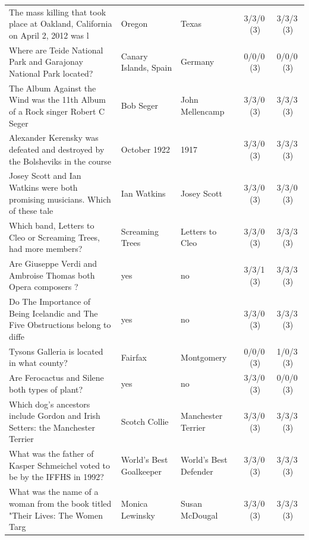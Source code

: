 \begin{longtable}{@{}p{6.6cm}p{2.9cm}p{2.9cm}cc@{}}
The mass killing that took place at Oakland, California on April 2, 2012 was l & Oregon & Texas & 3/3/0\,\footnotesize(3) & 3/3/3\,\footnotesize(3) \\
\rowcolor{neutralgray}
Where are Teide National Park and Garajonay National Park located? & Canary Islands, Spain & Germany & 0/0/0\,\footnotesize(3) & 0/0/0\,\footnotesize(3) \\
The Album Against the Wind was the 11th Album of a Rock singer Robert C Seger  & Bob Seger & John Mellencamp & 3/3/0\,\footnotesize(3) & 3/3/3\,\footnotesize(3) \\
\rowcolor{neutralgray}
Alexander Kerensky was defeated and destroyed by the Bolsheviks in the course  & October 1922 & 1917 & 3/3/0\,\footnotesize(3) & 3/3/3\,\footnotesize(3) \\
Josey Scott and Ian Watkins were both promising musicians. Which of these tale & Ian Watkins & Josey Scott & 3/3/0\,\footnotesize(3) & 3/3/0\,\footnotesize(3) \\
\rowcolor{neutralgray}
Which band, Letters to Cleo or Screaming Trees, had more members? & Screaming Trees & Letters to Cleo & 3/3/0\,\footnotesize(3) & 3/3/3\,\footnotesize(3) \\
Are Giuseppe Verdi and Ambroise Thomas both Opera composers ? & yes & no & 3/3/1\,\footnotesize(3) & 3/3/3\,\footnotesize(3) \\
\rowcolor{neutralgray}
Do The Importance of Being Icelandic and The Five Obstructions belong to diffe & yes & no & 3/3/0\,\footnotesize(3) & 3/3/3\,\footnotesize(3) \\
Tysons Galleria is located in what county? & Fairfax & Montgomery & 0/0/0\,\footnotesize(3) & 1/0/3\,\footnotesize(3) \\
\rowcolor{neutralgray}
Are Ferocactus and Silene both types of plant? & yes & no & 3/3/0\,\footnotesize(3) & 0/0/0\,\footnotesize(3) \\
Which dog's ancestors include Gordon and Irish Setters: the Manchester Terrier & Scotch Collie & Manchester Terrier & 3/3/0\,\footnotesize(3) & 3/3/3\,\footnotesize(3) \\
\rowcolor{neutralgray}
What was the father of Kasper Schmeichel voted to be by the IFFHS in 1992? & World's Best Goalkeeper & World's Best Defender & 3/3/0\,\footnotesize(3) & 3/3/3\,\footnotesize(3) \\
What was the name of a woman from the book titled "Their Lives: The Women Targ & Monica Lewinsky & Susan McDougal & 3/3/0\,\footnotesize(3) & 3/3/3\,\footnotesize(3) \\

\end{longtable}
